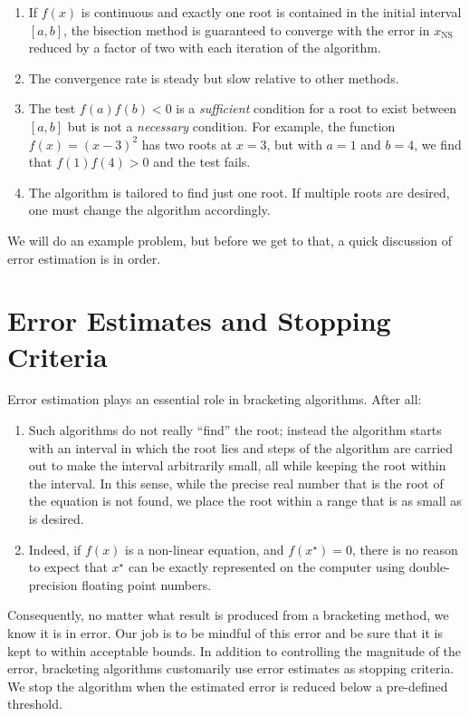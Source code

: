 \begin{enumerate}
\item If $f(x)$ is continuous and exactly one root is contained in the initial interval $[a,b]$, the bisection method is guaranteed to converge with the error in $x_{\text{NS}}$ reduced by a factor of two with each iteration of the algorithm.
\item The convergence rate is steady but slow relative to other methods.
\item The test $f(a)f(b)<0$ is a \emph{sufficient} condition for a root to exist between $[a,b]$ but is not a \emph{necessary} condition.  For example, the function $f(x)=\left(x-3\right)^2$ has two roots at $x=3$, but with $a=1$ and $b=4$, we find that $f(1)f(4)>0$ and the test fails.
\item The algorithm is tailored to find just one root.  If multiple roots are desired, one must change the algorithm accordingly.
\end{enumerate}
We will do an example problem, but before we get to that, a quick discussion of error estimation is in order.

\section{Error Estimates and Stopping Criteria}
Error estimation plays an essential role in bracketing algorithms.  After all:
\begin{enumerate}
\item Such algorithms do not really ``find'' the root; instead the algorithm starts with an interval in which the root lies and steps of the algorithm are carried out to make the interval arbitrarily small, all while keeping the root within the interval.  In this sense, while the precise real number that is the root of the equation is not found, we place the root within a range that is as small as is desired.

\item Indeed, if $f(x)$ is a non-linear equation, and $f(x^{\star})=0$, there is no reason to expect that $x^{\star}$ can be exactly represented on the computer using double-precision floating point numbers.
\end{enumerate}
Consequently, no matter what result is produced from a bracketing method, we know it is in error.  Our job is to be mindful of this error and be sure that it is kept to within acceptable bounds.  In addition to controlling the magnitude of the error, bracketing algorithms customarily use error estimates as stopping criteria.  We stop the algorithm when the estimated error is reduced below a pre-defined threshold.

